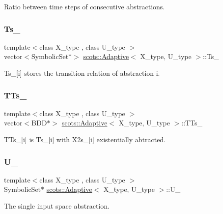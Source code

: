 Ratio between time steps of consecutive abstractions. \mbox{\label{classscots_1_1Adaptive_ab9f37fda9e698b797079d28b243f3a5b}} 
\subsubsection{\texorpdfstring{Ts\+\_\+}{Ts\_}}
{\footnotesize\ttfamily template$<$class X\+\_\+type , class U\+\_\+type $>$ \\
vector$<$Symbolic\+Set$\ast$$>$ \hyperlink{classscots_1_1Adaptive}{scots\+::\+Adaptive}$<$ X\+\_\+type, U\+\_\+type $>$\+::Ts\+\_\+}

Ts\+\_\+\mbox{[}i\mbox{]} stores the transition relation of abstraction i. \mbox{\label{classscots_1_1Adaptive_a1f4c02094ecd380887640c83fc1d0310}} 
\subsubsection{\texorpdfstring{T\+Ts\+\_\+}{TTs\_}}
{\footnotesize\ttfamily template$<$class X\+\_\+type , class U\+\_\+type $>$ \\
vector$<$B\+DD$\ast$$>$ \hyperlink{classscots_1_1Adaptive}{scots\+::\+Adaptive}$<$ X\+\_\+type, U\+\_\+type $>$\+::T\+Ts\+\_\+}

T\+Ts\+\_\+\mbox{[}i\mbox{]} is Ts\+\_\+\mbox{[}i\mbox{]} with X2s\+\_\+\mbox{[}i\mbox{]} existentially abtracted. \mbox{\label{classscots_1_1Adaptive_a89fa563cfea5b9a7bec6a705ca412a18}} 
\subsubsection{\texorpdfstring{U\+\_\+}{U\_}}
{\footnotesize\ttfamily template$<$class X\+\_\+type , class U\+\_\+type $>$ \\
Symbolic\+Set$\ast$ \hyperlink{classscots_1_1Adaptive}{scots\+::\+Adaptive}$<$ X\+\_\+type, U\+\_\+type $>$\+::U\+\_\+}

The single input space abstraction. \mbox{\label{classscots_1_1Adaptive_aa5c0bc8b175609073aa1f26ad6a83f1c}} 
